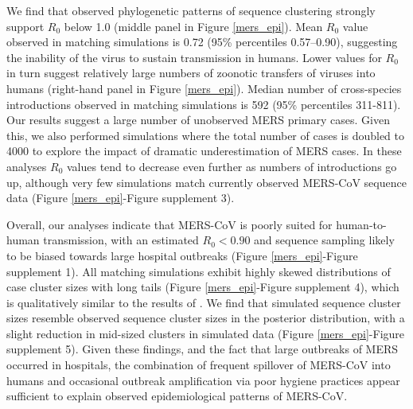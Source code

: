 \documentclass[9pt,lineno]{elife}
\begin{document}
We find that observed phylogenetic patterns of sequence clustering strongly support $R_{0}$ below 1.0 (middle panel in Figure \ref{mers_epi}).
Mean $R_{0}$ value observed in matching simulations is 0.72 (95\% percentiles 0.57--0.90), suggesting the inability of the virus to sustain transmission in humans.
Lower values for $R_{0}$ in turn suggest relatively large numbers of zoonotic transfers of viruses into humans (right-hand panel in Figure \ref{mers_epi}).
Median number of cross-species introductions observed in matching simulations is 592 (95\% percentiles 311-811).
Our results suggest a large number of unobserved MERS primary cases.
Given this, we also performed simulations where the total number of cases is doubled to 4000 to explore the impact of dramatic underestimation of MERS cases.
In these analyses $R_{0}$ values tend to decrease even further as numbers of introductions go up, although very few simulations match currently observed MERS-CoV sequence data (Figure \ref{mers_epi}-Figure supplement 3).

Overall, our analyses indicate that MERS-CoV is poorly suited for human-to-human transmission, with an estimated $R_{0}<0.90$ and sequence sampling likely to be biased towards large hospital outbreaks (Figure \ref{mers_epi}-Figure supplement 1).
All matching simulations exhibit highly skewed distributions of case cluster sizes with long tails (Figure \ref{mers_epi}-Figure supplement 4), which is qualitatively similar to the results of \citep{cauchemez_unraveling_2016}.
We find that simulated sequence cluster sizes resemble observed sequence cluster sizes in the posterior distribution, with a slight reduction in mid-sized clusters in simulated data (Figure \ref{mers_epi}-Figure supplement 5).
Given these findings, and the fact that large outbreaks of MERS occurred in hospitals, the combination of frequent spillover of MERS-CoV into humans and occasional outbreak amplification via poor hygiene practices \citep{assiri_hospital_2013,chen_comparative_2017} appear sufficient to explain observed epidemiological patterns of MERS-CoV.
\end{document}
